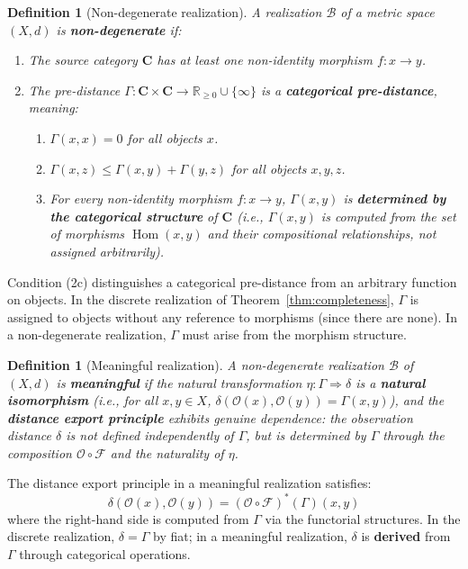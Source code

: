 \documentclass[11pt,a4paper]{article}
\newtheorem{definition}[theorem]{Definition}
\begin{document}
\begin{definition}[Non-degenerate realization]\label{def:nondegenerate}
A realization $\mathcal{B}$ of a metric space $(X,d)$ is \textbf{non-degenerate} if:
\begin{enumerate}
\item The source category $\mathbf{C}$ has at least one non-identity morphism $f:x\to y$.
\item The pre-distance $\Gamma:\mathbf{C}\times\mathbf{C}\to\mathbb{R}_{\geq 0}\cup\{\infty\}$ is a \textbf{categorical pre-distance}, meaning:
\begin{enumerate}
\item $\Gamma(x,x)=0$ for all objects $x$.
\item $\Gamma(x,z)\leq\Gamma(x,y)+\Gamma(y,z)$ for all objects $x,y,z$.
\item For every non-identity morphism $f:x\to y$, $\Gamma(x,y)$ is \textbf{determined by the categorical structure} of $\mathbf{C}$ (i.e., $\Gamma(x,y)$ is computed from the set of morphisms $\operatorname{Hom}(x,y)$ and their compositional relationships, not assigned arbitrarily).
\end{enumerate}
\end{enumerate}
\end{definition}

Condition (2c) distinguishes a categorical pre-distance from an arbitrary
function on objects. In the discrete realization of
Theorem~\ref{thm:completeness}, $\Gamma$ is assigned to objects without any
reference to morphisms (since there are none). In a non-degenerate
realization, $\Gamma$ must arise from the morphism structure.

\begin{definition}[Meaningful realization]\label{def:meaningful}
A non-degenerate realization $\mathcal{B}$ of $(X,d)$ is
\textbf{meaningful} if the natural transformation $\eta:\Gamma\Rightarrow\delta$
is a \textbf{natural isomorphism} (i.e., for all $x,y\in X$,
$\delta(\mathcal{O}(x),\mathcal{O}(y))=\Gamma(x,y)$), and the
\textbf{distance export principle} exhibits genuine dependence: the
observation distance $\delta$ is not defined independently of $\Gamma$,
but is determined by $\Gamma$ through the composition
$\mathcal{O}\circ\mathcal{F}$ and the naturality of $\eta$.
\end{definition}

The distance export principle in a meaningful realization satisfies:
\begin{equation}
\delta(\mathcal{O}(x),\mathcal{O}(y)) = (\mathcal{O}\circ\mathcal{F})^*(\Gamma)(x,y)
\end{equation}
where the right-hand side is computed from $\Gamma$ via the functorial
structures. In the discrete realization, $\delta=\Gamma$ by fiat; in a
meaningful realization, $\delta$ is \textbf{derived} from $\Gamma$ through
categorical operations.
\end{document}
